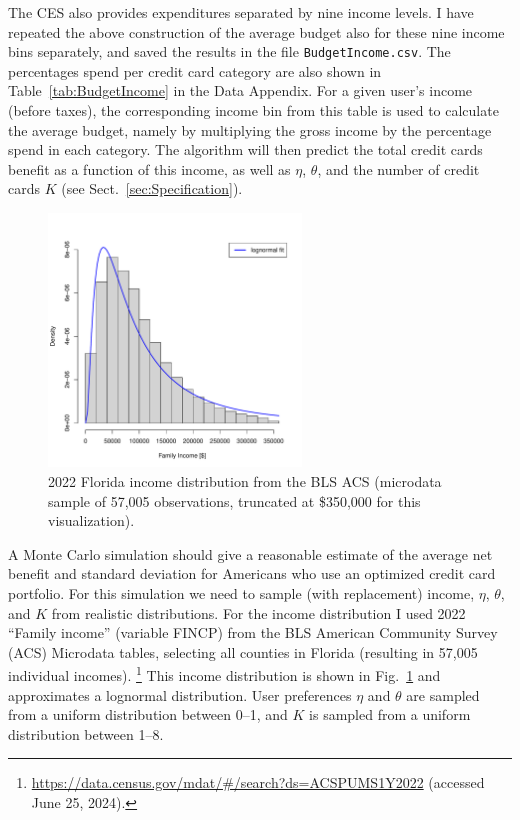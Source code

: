 The CES also provides expenditures separated by nine income levels. 
I have repeated the above construction of the average budget also for these nine income bins separately, and saved the results in the file \texttt{BudgetIncome.csv}. The percentages spend per credit card category are also shown in Table~\ref{tab:BudgetIncome} in the Data Appendix.
For a given user's income (before taxes), the corresponding income bin from this table is used to calculate the average budget, namely by multiplying the gross income by the percentage spend in each category. 
The algorithm will then predict the total credit cards benefit as a function of this income, as well as $\eta$, $\theta$, and the number of credit cards $K$ (see Sect.~\ref{sec:Specification}). 

\begin{figure}[t!h]
    \begin{center}
    \includegraphics[width=0.6\textwidth]{../Figures/IncomeDistribution.pdf}
    \caption{2022 Florida income distribution from the BLS ACS (microdata sample of 57,005 observations, truncated at \$350,000 for this visualization).}
    \label{fig:IncomeDistribution}
    \end{center}
\end{figure}

A Monte Carlo simulation should give a reasonable estimate of the average net benefit and standard deviation for Americans who use an optimized credit card portfolio. 
For this simulation we need to sample (with replacement) income, $\eta$, $\theta$, and $K$ from realistic distributions. 
For the income distribution I used 2022 ``Family income'' (variable FINCP) from the BLS American Community Survey (ACS) Microdata tables, selecting all counties in Florida (resulting in 57,005 individual incomes).%
\footnote{\url{https://data.census.gov/mdat/\#/search?ds=ACSPUMS1Y2022} (accessed June 25, 2024).}
This income distribution is shown in Fig.~\ref{fig:IncomeDistribution} and approximates a lognormal distribution.
User preferences $\eta$ and $\theta$ are sampled from a uniform distribution between 0--1, and $K$ is sampled from a uniform distribution between 1--8.
